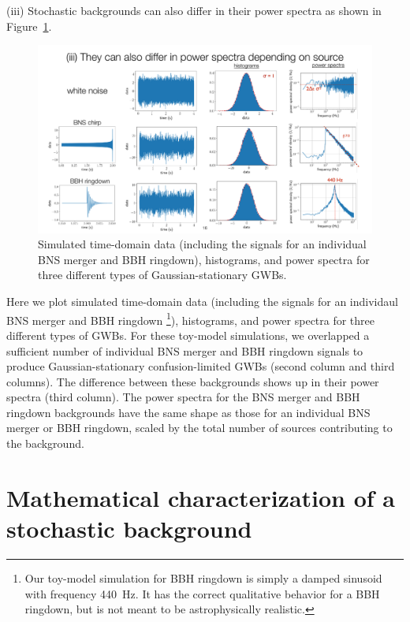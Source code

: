 \documentclass[11pt]{article}
\numberwithin{equation}{section}
\begin{document}
(iii) Stochastic backgrounds can also differ in their power 
spectra as shown in Figure~\ref{f:different_power_spectra}.
%
\begin{figure}[htbp!]
\begin{center}
\includegraphics[width=\textwidth]{Figures/different_power_spectra}
\caption{Simulated time-domain data (including the signals for an
individual BNS merger and BBH ringdown), histograms, and power spectra
for three different types of Gaussian-stationary GWBs.}
\label{f:different_power_spectra}
\end{center}
\end{figure}
%
Here we plot simulated time-domain data (including the signals for an
individaul BNS merger and BBH ringdown%
\footnote{Our toy-model simulation for BBH ringdown is simply a 
damped sinusoid with frequency 440~Hz.
It has the correct qualitative behavior for a BBH ringdown, but 
is not meant to be astrophysically realistic.}), 
histograms, and power spectra
for three different types of GWBs.
For these toy-model simulations, we overlapped a sufficient number of 
individual BNS merger and BBH ringdown signals to produce 
Gaussian-stationary confusion-limited GWBs
(second column and third columns).
The difference between these backgrounds shows up in their power 
spectra (third column).
The power spectra for the BNS merger and BBH ringdown backgrounds 
have the same shape as those for an individual BNS merger or 
BBH ringdown, scaled by the total number of sources contributing 
to the background.

\section{Mathematical characterization of a stochastic background}
\label{s:mathematical_characterization}
\end{document}
